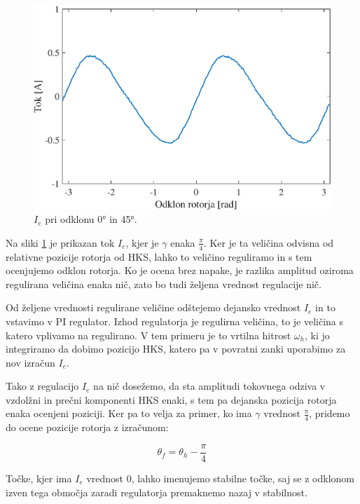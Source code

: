 \documentclass[a4paper,twoside,openright,12pt,slovene]{book}
\begin{document}
\begin{figure}[!htbp]
    \centering
    \includegraphics[width=1\columnwidth]{Slike/reguliranaVelicinaIdq0.eps}
    \caption{\label{reguliranaVelicinaIdq0} $I_e$ pri odklonu 0° in 45°.}
\end{figure}

Na sliki \ref{reguliranaVelicinaIdq0} je prikazan tok $I_e$, kjer je $\gamma$ enaka $\frac{\pi}{4}$. Ker je ta veličina odvisna od relativne pozicije rotorja od HKS, lahko to veličino reguliramo in s
tem ocenjujemo odklon rotorja. Ko je ocena brez napake, je razlika amplitud oziroma regulirana veličina enaka nič, zato bo tudi željena vrednost regulacije nič. 

Od željene vrednosti regulirane veličine odštejemo dejansko vrednost $I_e$ in to vstavimo v PI regulator. Izhod regulatorja je regulirna veličina, to je veličina s katero vplivamo na regulirano. 
V tem primeru je to vrtilna hitrost $\omega_h$, ki jo integriramo da dobimo pozicijo HKS, katero pa v povratni zanki uporabimo za nov izračun $I_e$. 

Tako z regulacijo $I_e$ na nič dosežemo, da sta amplitudi tokovnega odziva v vzdolžni in prečni komponenti HKS enaki, s tem pa dejanska pozicija rotorja enaka ocenjeni poziciji. 
Ker pa to velja za primer, ko ima $\gamma$ vrednost $\frac{\pi}{4}$, pridemo do ocene pozicije rotorja z izračunom:

\begin{equation}
    \theta_{f} = \theta_{h} - \frac{\pi}{4}
\end{equation}

Točke, kjer ima $I_e$ vrednost 0, lahko imenujemo stabilne točke, saj se z odklonom izven tega območja zaradi regulatorja premaknemo nazaj v stabilnost.
\end{document}
